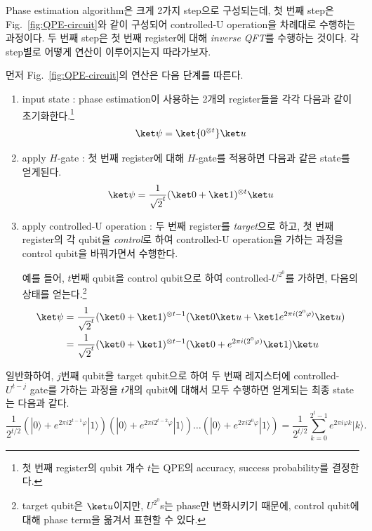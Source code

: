 Phase estimation algorithm은 크게 2가지 step으로 구성되는데, 첫 번째 step은 Fig.~\ref{fig:QPE-circuit}와 같이 구성되어 controlled-U operation을 차례대로 수행하는 과정이다.
두 번째 step은 첫 번째 register에 대해 \textit{inverse QFT}를 수행하는 것이다. 각 step별로 어떻게 연산이 이루어지는지 따라가보자.
\vspace{1em}

먼저 Fig.~\ref{fig:QPE-circuit}의 연산은 다음 단계를 따른다.
\begin{enumerate}
  \item input state : phase estimation이 사용하는 2개의 register들을 각각 다음과 같이 초기화한다.\footnote{첫 번째 register의 qubit 개수 $t$는 QPE의 accuracy, success probability를 결정한다.}
  \begin{equation*}
    \ket \psi = \ket {0^{\otimes t}} \ket u
  \end{equation*}
  \item apply $H$-gate : 첫 번째 register에 대해 $H$-gate를 적용하면 다음과 같은 state를 얻게된다.
  \begin{equation*}
    \ket \psi =  \frac{1}{\sqrt 2^t}(\ket 0 + \ket 1)^{\otimes t} \ket u
  \end{equation*}
  \item apply controlled-U operation : 두 번째 register를 \textit{target}으로 하고, 첫 번째 register의 각 qubit을 \textit{control}로 하여 controlled-U operation을 가하는 과정을 control qubit을 바꿔가면서 수행한다.
  
  예를 들어, $t$번째 qubit을 control qubit으로 하여 controlled-$U^{2^0}$를 가하면, 다음의 상태를 얻는다.\footnote{target qubit은 $\ket u$이지만, $U^{2^0}$s는 phase만 변화시키기 때문에, control qubit에 대해 phase term을 옮겨서 표현할 수 있다.}
  \begin{align*}
    \ket \psi &= \frac{1}{\sqrt 2^t} (\ket 0 + \ket 1)^{\otimes {t-1}} (\ket 0 \ket u + \ket 1 e^{2\pi i (2^0 \varphi)} \ket u)\\
              &=  \frac{1}{\sqrt 2^t} (\ket 0 + \ket 1)^{\otimes {t-1}} (\ket 0 + e^{2\pi i (2^0 \varphi)} \ket 1) \ket u
  \end{align*}
\end{enumerate}

일반화하여, $j$번째 qubit을 target qubit으로 하여 두 번째 레지스터에 controlled-$U^{t-j}$ gate를 가하는 과정을 $t$개의 qubit에 대해서 모두 수행하면 얻게되는 최종 state는 다음과 같다.
\begin{equation}
  \frac{1}{2^{t / 2}}\left(|0\rangle+e^{2 \pi i 2^{t-1} \varphi}|1\rangle\right)\left(|0\rangle+e^{2 \pi i 2^{t-2} \varphi}|1\rangle\right) \ldots\left(|0\rangle+e^{2 \pi i 2^0 \varphi}|1\rangle\right)=\frac{1}{2^{t / 2}} \sum_{k=0}^{2^t-1} e^{2 \pi i \varphi k}|k\rangle . \label{eq:QPE-1}
\end{equation}

